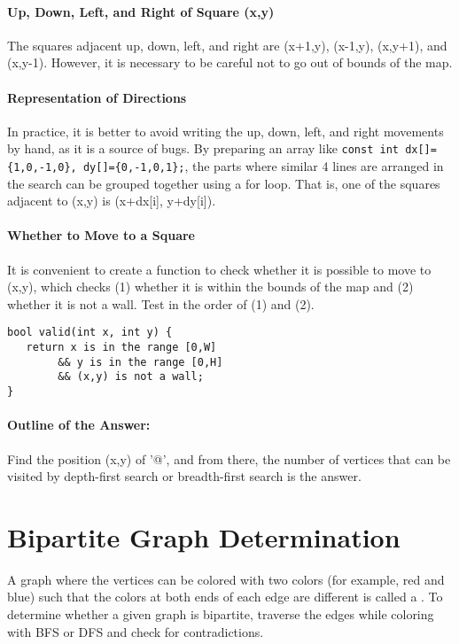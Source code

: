 \paragraph{Up, Down, Left, and Right of Square (x,y)} The squares adjacent up, down, left, and right are (x+1,y), (x-1,y), (x,y+1), and (x,y-1). However, it is necessary to be careful not to go out of bounds of the map.

\paragraph{Representation of Directions}

In practice, it is better to avoid writing the up, down, left, and right movements by hand, as it is a source of bugs. By preparing an array like \texttt{const int dx[]=\{1,0,-1,0\}, dy[]=\{0,-1,0,1\};}, the parts where similar 4 lines are arranged in the search can be grouped together using a for loop. That is, one of the squares adjacent to (x,y) is (x+dx[i], y+dy[i]).

\paragraph{Whether to Move to a Square} It is convenient to create a function to check whether it is possible to move to (x,y), which checks (1) whether it is within the bounds of the map and (2) whether it is not a wall. Test in the order of (1) and (2).

\begin{cbox}
\begin{verbatim}
bool valid(int x, int y) {
   return x is in the range [0,W]
        && y is in the range [0,H]
        && (x,y) is not a wall;
}
\end{verbatim}
\end{cbox}

\paragraph{Outline of the Answer:} Find the position (x,y) of '@', and from there, the number of vertices that can be visited by depth-first search or breadth-first search is the answer.
\section{Bipartite Graph Determination}

A graph where the vertices can be colored with two colors (for example, red and blue) such that the colors at both ends of each edge are different is called a .
To determine whether a given graph is bipartite, traverse the edges while coloring with BFS or DFS and check for contradictions.
  
